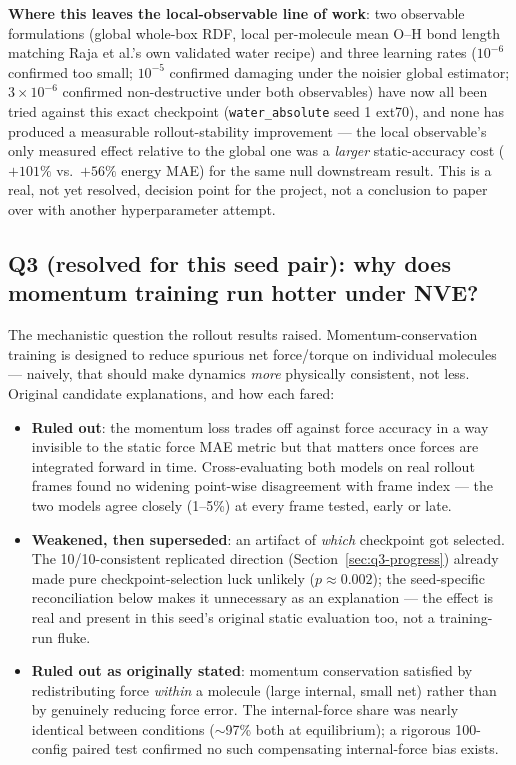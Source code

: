\documentclass[11pt]{article}
\begin{document}
\textbf{Where this leaves the local-observable line of work}: two
observable formulations (global whole-box RDF, local per-molecule mean
O--H bond length matching Raja et al.'s own validated water recipe) and
three learning rates ($10^{-6}$ confirmed too small; $10^{-5}$ confirmed
damaging under the noisier global estimator; $3\times10^{-6}$ confirmed
non-destructive under both observables) have now all been tried against
this exact checkpoint (\texttt{water\_absolute} seed 1 ext70), and none has
produced a measurable rollout-stability improvement --- the local
observable's only measured effect relative to the global one was a
\emph{larger} static-accuracy cost ($+101\%$ vs.\ $+56\%$ energy MAE) for
the same null downstream result. This is a real, not yet resolved, decision
point for the project, not a conclusion to paper over with another
hyperparameter attempt.

\subsection{Q3 (resolved for this seed pair): why does momentum training run
hotter under NVE?}
\label{sec:q3}

The mechanistic question the rollout results raised. Momentum-conservation
training is designed to reduce spurious net force/torque on individual
molecules --- naively, that should make dynamics \emph{more} physically
consistent, not less. Original candidate explanations, and how each fared:
\begin{itemize}
  \item \textbf{Ruled out}: the momentum loss trades off against force
  accuracy in a way invisible to the static force MAE metric but that
  matters once forces are integrated forward in time. Cross-evaluating both
  models on real rollout frames found no widening point-wise disagreement
  with frame index --- the two models agree closely (1--5\%) at every frame
  tested, early or late.
  \item \textbf{Weakened, then superseded}: an artifact of \emph{which}
  checkpoint got selected. The 10/10-consistent replicated direction
  (Section~\ref{sec:q3-progress}) already made pure checkpoint-selection
  luck unlikely ($p\approx0.002$); the seed-specific reconciliation below
  makes it unnecessary as an explanation --- the effect is real and present
  in this seed's original static evaluation too, not a training-run fluke.
  \item \textbf{Ruled out as originally stated}: momentum conservation
  satisfied by redistributing force \emph{within} a molecule (large
  internal, small net) rather than by genuinely reducing force error. The
  internal-force share was nearly identical between conditions
  ($\sim$97\% both at equilibrium); a rigorous 100-config paired test
  confirmed no such compensating internal-force bias exists.
\end{itemize}
\end{document}
